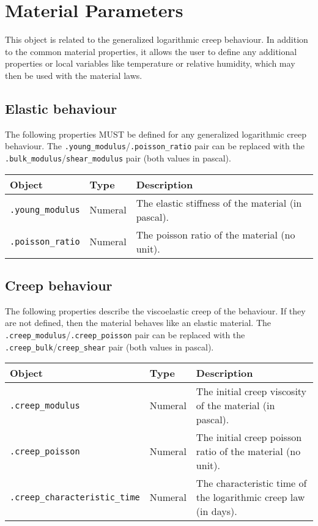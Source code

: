 \documentclass[10pt]{article}
\begin{document}
\section{Material Parameters}

This object is related to the generalized logarithmic creep behaviour. In addition to the common material properties, it allows the user to define any additional properties or local variables like temperature or relative humidity, which may then be used with the material laws.

\subsection{Elastic behaviour}

The following properties MUST be defined for any generalized logarithmic creep behaviour. The \verb+.young_modulus+/\verb+.poisson_ratio+ pair can be replaced with the \verb+.bulk_modulus+/\verb+shear_modulus+ pair (both values in pascal).\\

\begin{tabularx}{\textwidth}{llX}
\hline 
Object & Type & Description \\ 
\hline 
\verb+.young_modulus+ & Numeral & The elastic stiffness of the material (in pascal).\\
\verb+.poisson_ratio+ & Numeral & The poisson ratio of the material (no unit).\\
\hline 
\end{tabularx}

\subsection{Creep behaviour}

The following properties describe the viscoelastic creep of the behaviour. If they are not defined, then the material behaves like an elastic material. The \verb+.creep_modulus+/\verb+.creep_poisson+ pair can be replaced with the \verb+.creep_bulk+/\verb+creep_shear+ pair (both values in pascal).\\

\begin{tabularx}{\textwidth}{llX}
\hline 
Object & Type & Description \\ 
\hline 
\verb+.creep_modulus+ & Numeral & The initial creep viscosity of the material (in pascal).\\
\verb+.creep_poisson+ & Numeral & The initial creep poisson ratio of the material (no unit).\\
\verb+.creep_characteristic_time+ & Numeral & The characteristic time of the logarithmic creep law (in days).\\
\hline 
\end{tabularx}
\end{document}
